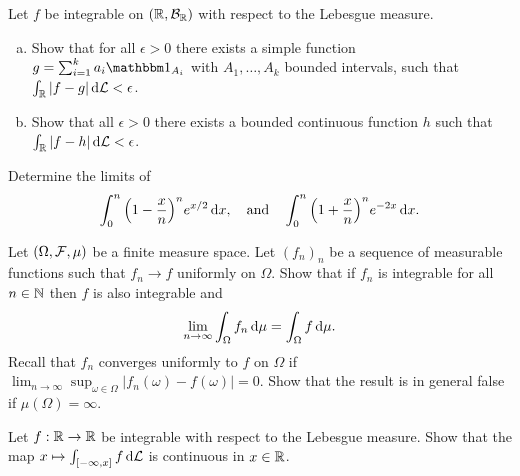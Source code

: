 \begin{problem} Let $f$ be integrable on $(\mathbb R,\mathcal B_{\mathbb R})$ with respect to the Lebesgue measure. 
    \begin{enumerate}[a)]
        \item Show that for all $\epsilon>0$ there exists a simple function $g = \sum_{i=1}^k a_i \indE{A_i}$ with $A_1,\ldots, A_k$ bounded intervals, such that $\int_{\mathbb R} |f-g|\,\mathrm{d} \mathcal L<\epsilon$.
        \item Show that all $\epsilon>0$ there exists a bounded continuous function $h$ such that $\int_{\mathbb R} |f-h|\,\mathrm{d} \mathcal L<\epsilon$.
    \end{enumerate}
\end{problem}

\begin{problem} Determine the limits of 
    \begin{equation*}
        \int_0^n \Big(1-\frac{x}{n}\Big)^n e^{x/2}\,\mathrm{d} x,\quad\text{and}\quad \int_0^n \Big(1+\frac{x}{n}\Big)^n e^{-2x}\,\mathrm{d} x.
    \end{equation*}
\end{problem}

\begin{problem} Let $(\Omega,\mathcal F,\mu)$ be a finite measure space. Let $(f_n)_n$ be a sequence of measurable functions such that $f_n\to f$ uniformly on $\Omega$. Show that if $f_n$ is integrable for all $n\in\mathbb N$ then $f$ is also integrable and
    \begin{equation*}
        \lim_{n\to\infty} \int_\Omega f_n \,\mathrm{d} \mu = \int_\Omega f \,\mathrm{d} \mu. 
    \end{equation*}
Recall that $f_n$ converges uniformly to $f$ on $\Omega$ if $\lim_{n\to\infty} \sup_{\omega\in \Omega} |f_n(\omega)-f(\omega)| = 0$.
Show that the result is in general false if $\mu(\Omega) = \infty$.
\end{problem}

\begin{problem}
    Let $f:\mathbb R\to \mathbb R$ be integrable with respect to the Lebesgue measure. Show that the map $x\mapsto \int_{[-\infty,x]} f\,\mathrm{d} \mathcal L$ is continuous in $x\in \mathbb R$.
\end{problem}

